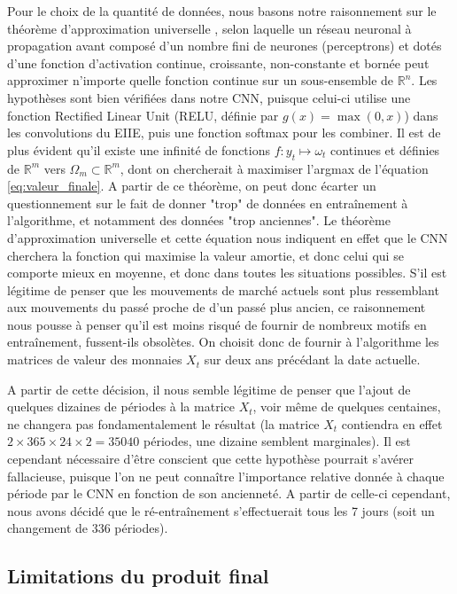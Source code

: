 \documentclass[a4paper, 10pt]{article}
\begin{document}
Pour le choix de la quantité de données, nous basons notre raisonnement sur le théorème d'approximation universelle \cite{Hornik1991}, selon laquelle un réseau neuronal à propagation avant composé d'un nombre fini de neurones (perceptrons) et dotés d'une fonction d'activation continue, croissante, non-constante et bornée peut approximer n'importe quelle fonction continue sur un sous-ensemble de $\mathbb{R}^n$. Les hypothèses sont bien vérifiées dans notre CNN, puisque celui-ci utilise une fonction Rectified Linear Unit (RELU, définie par $g(x) = \max(0, x)$) dans les convolutions du EIIE, puis une fonction softmax pour les combiner. Il est de plus évident qu'il existe une infinité de fonctions $f \colon y_t \mapsto \omega_t$ continues et définies de $\mathbb{R}^m$ vers $\Omega_m \subset \mathbb{R}^m$, dont on chercherait à maximiser l'argmax de l'équation \eqref{eq:valeur_finale}. A partir de ce théorème, on peut donc écarter un questionnement sur le fait de donner "trop" de données en entraînement à l'algorithme, et notamment des données "trop anciennes". Le théorème d'approximation universelle et cette équation nous indiquent en effet que le CNN cherchera la fonction qui maximise la valeur amortie, et donc celui qui se comporte mieux en moyenne, et donc dans toutes les situations possibles. S'il est légitime de penser que les mouvements de marché actuels sont plus ressemblant aux mouvements du passé proche de d'un passé plus ancien, ce raisonnement nous pousse à penser qu'il est moins risqué de fournir de nombreux motifs en entraînement, fussent-ils obsolètes. On choisit donc de fournir à l'algorithme les matrices de valeur des monnaies $X_t$ sur deux ans précédant la date actuelle.

A partir de cette décision, il nous semble légitime de penser que l'ajout de quelques dizaines de périodes à la matrice $X_t$, voir même de quelques centaines, ne changera pas fondamentalement le résultat (la matrice $X_t$ contiendra en effet $2 \times 365 \times 24 \times 2 = 35 040$ périodes, une dizaine semblent marginales). Il est cependant nécessaire d'être conscient que cette hypothèse pourrait s'avérer fallacieuse, puisque l'on ne peut connaître l'importance relative donnée à chaque période par le CNN en fonction de son ancienneté. A partir de celle-ci cependant, nous avons décidé que le ré-entraînement s'effectuerait tous les 7 jours (soit un changement de $336$ périodes).

\subsection{Limitations du produit final}
\label{sec:developpement_limites}
\end{document}
